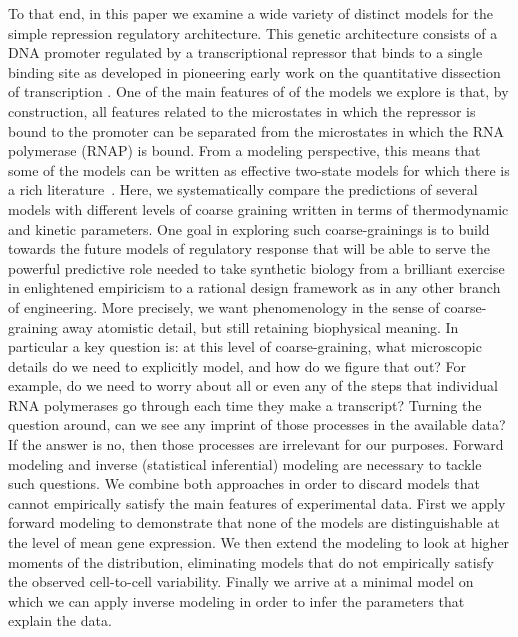To that end, in this paper we examine a wide variety of distinct models for the
simple repression regulatory architecture. This genetic architecture consists of
a DNA promoter regulated by a transcriptional repressor that binds to a single
binding site as developed in pioneering early work on the quantitative
dissection of transcription \cite{Oehler1994, Oehler1990}. One of the main
features of of the models we explore is that, by construction, all features
related to the microstates in which the repressor is bound to the promoter can
be separated from the microstates in which the RNA polymerase (RNAP) is bound.
From a modeling perspective, this means that some of the models can be written
as effective two-state models for which there is a rich
literature~\cite{Peccoud1995,Bintu2005a,Shahrezaei2008,Iyer-Biswas2009,Sanchez2013,Jones2014}.
Here, we systematically compare the predictions of several models with different
levels of coarse graining written in terms of thermodynamic and kinetic
parameters. One goal in exploring such coarse-grainings is to build towards the
future models of regulatory response that will be able to serve the powerful
predictive role needed to take synthetic biology from a brilliant exercise in
enlightened empiricism to a rational design framework as in any other branch of
engineering. More precisely, we want phenomenology in the sense of
coarse-graining away atomistic detail, but still retaining biophysical meaning.
In particular a key question is: at this level of coarse-graining, what
microscopic details do we need to explicitly model, and how do we figure that
out? For example, do we need to worry about all or even any of the steps that
individual RNA polymerases go through each time they make a transcript? Turning
the question around, can we see any imprint of those processes in the available
data? If the answer is no, then those processes are irrelevant for our purposes.
Forward modeling and inverse (statistical inferential) modeling are necessary to
tackle such questions. We combine both approaches in order to discard models 
that cannot empirically satisfy the main features of experimental data. First we
apply forward modeling to demonstrate that none of the models are 
distinguishable at the level of mean gene expression. We then extend the 
modeling to look at higher moments of the distribution, eliminating models that
do not empirically satisfy the observed cell-to-cell variability. Finally we 
arrive at a minimal model on which we can apply inverse modeling in order to 
infer the parameters that explain the data.

